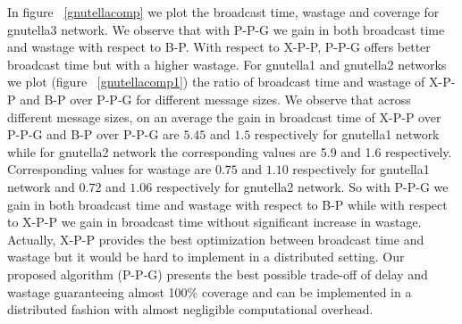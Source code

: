 In figure ~\ref{gnutellacomp} we plot the broadcast time, wastage and coverage for gnutella3 network. 
We observe that with P-P-G we gain in both broadcast time and wastage with respect to B-P. With respect to X-P-P, P-P-G offers better 
broadcast time but with a higher wastage.
For gnutella1 and gnutella2 networks 
we plot (figure ~\ref{gnutellacomp1}) the ratio of broadcast time and wastage of X-P-P and B-P over P-P-G for different message sizes. 
We observe that across different message sizes, on an average the gain in broadcast time of X-P-P over P-P-G and B-P over P-P-G are $5.45$ and $1.5$ respectively for 
gnutella1 network while for gnutella2 network the corresponding values are 5.9 and 1.6 respectively. Corresponding values for wastage are $0.75$ and $1.10$ 
respectively for gnutella1 network and $0.72$ and $1.06$ respectively for gnutella2 network. 
So with P-P-G we gain in both broadcast time and wastage with respect to B-P while with respect to X-P-P 
we gain in broadcast time without significant increase in wastage.
 Actually, X-P-P provides the best optimization between broadcast time and wastage but it would be hard to implement in a 
distributed setting. 
Our proposed algorithm (P-P-G) presents the best possible trade-off of delay and wastage guaranteeing almost 100\% coverage and can be implemented in a distributed fashion with almost negligible computational overhead.
% 
